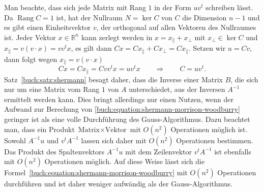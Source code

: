 Man beachte, dass sich jede Matrix mit Rang $1$ in der Form $uv^t$
schreiben lässt.
Da $\operatorname{Rang}C=1$ ist, hat der Nullraum $N=\operatorname{ker}C$
von $C$ die Dimension $n-1$ und es gibt einen Einheitsvektor $v$,
der orthogonal auf allen Vektoren des Nullraumes ist.
Jeder Vektor $x\in \mathbb R^n$ kann zerlegt werden in
$x=x_{\|} + x_{\perp}$ mit $x_{\perp}\in\operatorname{ker}C$ und
$x_{\|}=v(v\cdot x)=v v^tx$, es gilt dann
$Cx = Cx_{\|} + Cx_{\perp} = Cx_{\|}$.
Setzen wir $u=Cv$, dann folgt wegen $x_{\|} = v(v\cdot x)$ 
\[
Cx = Cx_{\|} = Cv v^t x = uv^t x
\qquad\Rightarrow\qquad
C = uv^t.
\]
Satz~\ref{buch:satz:shermann} besagt daher, dass die Inverse einer
Matrix $B$, die sich nur um eine Matrix vom Rang $1$ von $A$ unterschiedet,
aus der Inversen $A^{-1}$ ermittelt werden kann.
Dies bringt allerdings nur einen Nutzen, wenn der Aufwand zur Berechung
von \eqref{buch:equation:shermann-morrison-woodburry} geringer ist als
eine volle Durchführung des Gauss-Algorithmus.
Dazu beachtet man, dass ein Produkt $\text{Matrix}\times\text{Vektor}$ 
mit $O(n^2)$ Operationen möglich ist.
Sowohl $A^{-1}u$ und $v^tA^{-1}$ lassen sich daher mit $O(n^2)$
Operationen bestimmen.
Das Produkt des Spaltenvektors $A^{-1}u$ mit dem Zeilenvektor $v^tA^{-1}$
ist ebenfalls mit $O(n^2)$ Operationen möglich.
Auf diese Weise lässt sich
die Formel~\ref{buch:equation:shermann-morrison-woodburry} mit
$O(n^2)$ Operationen durchführen und ist daher weniger aufwändig als
der Gauss-Algorithmus.
 


